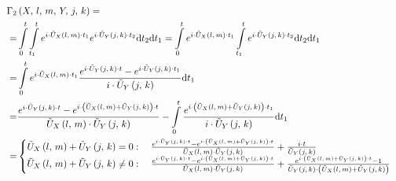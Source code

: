\begin{equation}
    \label{eq:time-ordered-integral-part2}
    \begin{split}
        \Gamma_2&\left(X,\,l,\,m,\,Y,\,j,\,k\right) =\\ =&\int\limits_0^t  \int\limits_{t_1}^t
        e^{
            i \cdot \tilde{U}_\text{$X$}\left(l,\,m\right) \cdot t_1
        }
        e^{
            i \cdot \tilde{U}_\text{$Y$}\left(j,\,k\right) \cdot t_2
        }
        \mathrm{d}t_2
        \mathrm{d}t_1 = 
        \int\limits_0^t 
        e^{
            i \cdot \tilde{U}_\text{$X$}\left(l,\,m\right) \cdot t_1
        }
        \int\limits_{t_1}^t
        e^{
            i \cdot \tilde{U}_\text{$Y$}\left(j,\,k\right) \cdot t_2
        }
        \mathrm{d}t_2
        \mathrm{d}t_1 \\=
        &\int\limits_0^t 
        e^{
            i \cdot \tilde{U}_\text{$X$}\left(l,\,m\right) \cdot t_1
        }
        \frac{
            e^{
                i \cdot \tilde{U}_\text{$Y$}\left(j,\,k\right) \cdot t
            }
            -
            e^{
                i \cdot \tilde{U}_\text{$Y$}\left(j,\,k\right) \cdot t_1
            }
        }{
            i \cdot\tilde{U}_\text{$Y$}\left(j,\,k\right)
        }
        \mathrm{d}t_1 \\=
        &\frac{
            e^{
                i \cdot \tilde{U}_\text{$Y$}\left(j,\,k\right) \cdot t
            }
            -
            e^{
                i \cdot \left(\tilde{U}_\text{$X$}\left(l,\,m\right) + \tilde{U}_\text{$Y$}\left(j,\,k\right) \right) \cdot t
            }
        }{
            \tilde{U}_\text{$X$}\left(l,\,m\right) \cdot\tilde{U}_\text{$Y$}\left(j,\,k\right)
        } -
        \int\limits_0^t 
        \frac{
            e^{
                i \cdot \left(\tilde{U}_\text{$X$}\left(l,\,m\right) + \tilde{U}_\text{$Y$}\left(j,\,k\right) \right) \cdot t_1
            }
        }{
            i \cdot\tilde{U}_\text{$Y$}\left(j,\,k\right)
        }
        \mathrm{d}t_1\\=
        &\begin{cases}
            \tilde{U}_\text{$X$}\left(l,\,m\right) + \tilde{U}_\text{$Y$}\left(j,\,k\right) = 0: \quad
            \frac{
                e^{
                    i \cdot \tilde{U}_\text{$Y$}\left(j,\,k\right) \cdot t
                }
                -
                e^{
                    i \cdot \left(\tilde{U}_\text{$X$}\left(l,\,m\right) + \tilde{U}_\text{$Y$}\left(j,\,k\right) \right) \cdot t
                }
            }{
                \tilde{U}_\text{$X$}\left(l,\,m\right) \cdot\tilde{U}_\text{$Y$}\left(j,\,k\right)
            } + \frac{i \cdot t}{\tilde{U}_\text{$Y$}\left(j,\,k\right)}            \\
            \tilde{U}_\text{$X$}\left(l,\,m\right) + \tilde{U}_\text{$Y$}\left(j,\,k\right) \neq 0: \quad
            \frac{
                e^{
                    i \cdot \tilde{U}_\text{$Y$}\left(j,\,k\right) \cdot t
                }
                -
                e^{
                    i \cdot \left(\tilde{U}_\text{$X$}\left(l,\,m\right) + \tilde{U}_\text{$Y$}\left(j,\,k\right) \right) \cdot t
                }
            }{
                \tilde{U}_\text{$X$}\left(l,\,m\right) \cdot\tilde{U}_\text{$Y$}\left(j,\,k\right)
            } + \frac{
                e^{
                    i \cdot \left(\tilde{U}_\text{$X$}\left(l,\,m\right) + \tilde{U}_\text{$Y$}\left(j,\,k\right) \right) \cdot t
                }
                -1
            }{\tilde{U}_\text{$Y$}\left(j,\,k\right) \cdot \left(\tilde{U}_\text{$X$}\left(l,\,m\right) + \tilde{U}_\text{$Y$}\left(j,\,k\right) \right)}  
        \end{cases}
    \end{split}
\end{equation}

